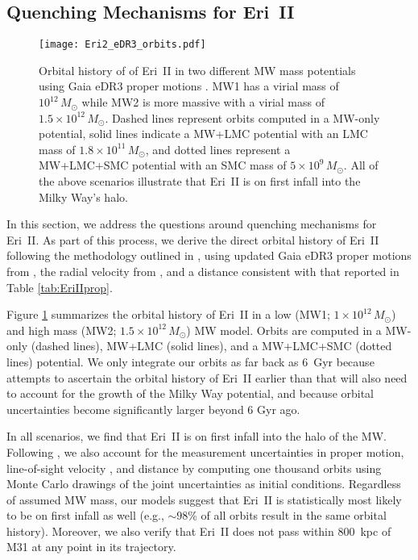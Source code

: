 \documentclass[twocolumn]{aastex63}
\begin{document}
\subsection{Quenching Mechanisms for Eri~II}

\begin{figure}
    \centering
    \texttt{[image: Eri2\_eDR3\_orbits.pdf]}
    \caption{Orbital history of  of Eri~II in two different MW mass potentials using Gaia eDR3 proper motions \citep{mcconnachie21b}. MW1 has a virial mass of $10^{12}\, M_{\odot}$ while MW2 is more massive with a virial mass of $1.5 \times 10^{12}\, M_{\odot}$. Dashed lines represent orbits computed in a MW-only potential, solid lines indicate a MW+LMC potential with an LMC mass of $1.8\times 10^{11} \, M_{\odot}$, and dotted lines represent a MW+LMC+SMC potential with an SMC mass of $5\times 10^{9} \, M_{\odot}$. All of the above scenarios illustrate that Eri~II is on first infall into the Milky Way's halo.}
    \label{fig:EriIIorbit}
\end{figure}

\par In this section, we address the questions around quenching mechanisms for Eri~II. As part of this process, we derive the direct orbital history of Eri~II following the methodology outlined in \citet{patel2020}, using updated Gaia eDR3 proper motions from \citet{mcconnachie21b}, the radial velocity from \citet{li2017eriII}, and a distance consistent with that reported in Table \ref{tab:EriIIprop}. 

\par Figure \ref{fig:EriIIorbit} summarizes the orbital history of Eri~II in a low (MW1; $1\times10^{12}\,M_{\odot}$) and high mass (MW2; $1.5\times10^{12}\,M_{\odot}$) MW model. Orbits are computed in a MW-only (dashed lines), MW+LMC (solid lines), and a MW+LMC+SMC (dotted lines) potential. We only integrate our orbits as far back as 6~Gyr because attempts to ascertain the orbital history of Eri~II earlier than that will also need to account for the growth of the Milky Way potential, and because orbital uncertainties become significantly larger beyond 6 Gyr ago. 

\par In all scenarios, we find that Eri~II is on first infall into the halo of the MW. Following \citet{patel2020}, we also account for the measurement uncertainties in proper motion, line-of-sight velocity \citep{li2017eriII}, and distance by computing one thousand orbits using Monte Carlo drawings of the joint uncertainties as initial conditions. Regardless of assumed MW mass, our models suggest that Eri~II is statistically most likely to be on first infall as well (e.g., $\sim98$\% of all orbits result in the same orbital history). Moreover, we also verify that Eri~II does not pass within 800~kpc of M31 at any point in its trajectory. 
\end{document}
